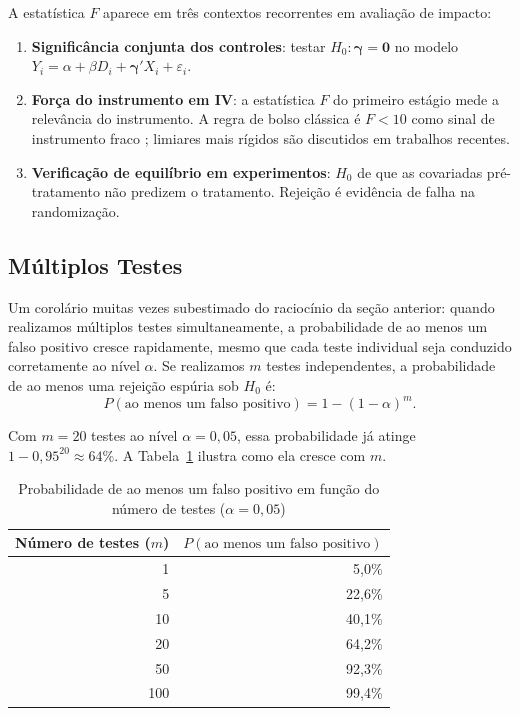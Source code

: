 A estatística $F$ aparece em três contextos recorrentes em avaliação de impacto:

\begin{enumerate}[leftmargin=*, label=(\roman*)]
  \item \textbf{Significância conjunta dos controles}: testar $H_0: \boldsymbol{\gamma} = \mathbf{0}$
    no modelo $Y_i = \alpha + \beta D_i + \boldsymbol{\gamma}' X_i + \varepsilon_i$.
  \item \textbf{Força do instrumento em IV}: a estatística $F$ do primeiro estágio mede a relevância do instrumento. A regra de bolso clássica é $F < 10$ como sinal de instrumento fraco \citep{StockYogo2005}; limiares mais rígidos são discutidos em trabalhos recentes.
  \item \textbf{Verificação de equilíbrio em experimentos}: $H_0$ de que as covariadas pré-tratamento não predizem o tratamento. Rejeição é evidência de falha na randomização.
\end{enumerate}


\subsection{Múltiplos Testes}
\label{sec:multiplos_testes}

Um corolário muitas vezes subestimado do raciocínio da seção anterior: quando realizamos múltiplos testes simultaneamente, a probabilidade de ao menos um falso positivo cresce rapidamente, mesmo que cada teste individual seja conduzido corretamente ao nível $\alpha$. Se realizamos $m$ testes independentes, a probabilidade de ao menos uma rejeição espúria sob $H_0$ é:
\begin{equation}
  P(\text{ao menos um falso positivo}) = 1 - (1 - \alpha)^m.
  \label{eq:multiplos_testes}
\end{equation}

Com $m = 20$ testes ao nível $\alpha = 0{,}05$, essa probabilidade já atinge $1 - 0{,}95^{20} \approx 64\%$. A Tabela~\ref{tab:multiplos_testes} ilustra como ela cresce com $m$.

\begin{table}[H]
\centering
\caption{Probabilidade de ao menos um falso positivo em função do número de testes ($\alpha = 0{,}05$)}
\label{tab:multiplos_testes}
\begin{tabular}{rr}
\toprule
Número de testes ($m$) & $P(\text{ao menos um falso positivo})$ \\
\midrule
 1  & 5{,}0\% \\
 5  & 22{,}6\% \\
10  & 40{,}1\% \\
20  & 64{,}2\% \\
50  & 92{,}3\% \\
100 & 99{,}4\% \\
\bottomrule
\end{tabular}

\vspace{4pt}
\end{table}

